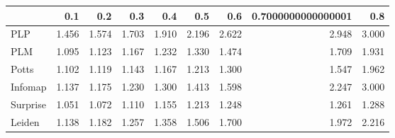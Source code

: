 \begin{tabular}{lrrrrrrrr}
\toprule
{} &   0.1 &   0.2 &   0.3 &   0.4 &   0.5 &   0.6 & 0.7000000000000001 &   0.8 \\
\midrule
PLP      & 1.456 & 1.574 & 1.703 & 1.910 & 2.196 & 2.622 &              2.948 & 3.000 \\
PLM      & 1.095 & 1.123 & 1.167 & 1.232 & 1.330 & 1.474 &              1.709 & 1.931 \\
Potts    & 1.102 & 1.119 & 1.143 & 1.167 & 1.213 & 1.300 &              1.547 & 1.962 \\
Infomap  & 1.137 & 1.175 & 1.230 & 1.300 & 1.413 & 1.598 &              2.247 & 3.000 \\
Surprise & 1.051 & 1.072 & 1.110 & 1.155 & 1.213 & 1.248 &              1.261 & 1.288 \\
Leiden   & 1.138 & 1.182 & 1.257 & 1.358 & 1.506 & 1.700 &              1.972 & 2.216 \\
\bottomrule
\end{tabular}
